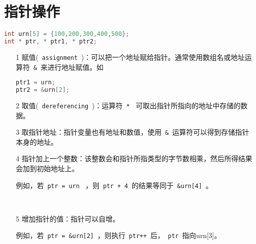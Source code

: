 \section{指针操作}

\begin{frame}[fragile]\ft{\secname}
\begin{lstlisting}[language=c,backgroundcolor=\color{red!20}]
int urn[5] = {100,200,300,400,500};
int * ptr, * ptr1, * ptr2;
\end{lstlisting}
\end{frame}

\begin{frame}[fragile]\ft{\secname}

\begin{itemize}
\item[1] 赋值(\lstinline| assignment |)：可以把一个地址赋给指针。通常使用数组名或地址运算符\lstinline| & |来进行地址赋值。如
\begin{lstlisting}[language=c,backgroundcolor=\color{red!20}]
ptr1 = urn;
ptr2 = &urn[2];
\end{lstlisting}
\end{itemize}
\end{frame}

\begin{frame}[fragile]\ft{\secname}
\begin{itemize}
\item[2] 取值(\lstinline| dereferencing |)：运算符\lstinline| * | 可取出指针所指向的地址中存储的数据。\\[0.2in]
\item[3] 取指针地址：指针变量也有地址和数值，使用\lstinline| & |运算符可以得到存储指针本身的地址。\\[0.2in]
\end{itemize}
\end{frame}

\begin{frame}[fragile]\ft{\secname}
\begin{itemize}
\item[4] 指针加上一个整数：该整数会和指针所指类型的字节数相乘，然后所得结果会加到初始地址上。\\[0.1in]
\item[] 例如，若\lstinline| ptr = urn | ，则\lstinline| ptr + 4 |的结果等同于\lstinline| &urn[4] |。
\\[0.1in]
\item[]
\\[0.2in]

\item[5] 增加指针的值：指针可以自增。\\[0.1in]
\item[] 例如，若\lstinline| ptr = &urn[2] |，则执行\lstinline| ptr++ |后，\lstinline| ptr |指向{\tf urn[3]}。
\end{itemize}
\end{frame}

